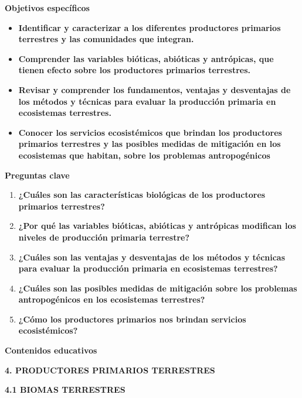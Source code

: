 \documentclass[
]{article}
\providecommand{\tightlist}{%
  \setlength{\itemsep}{0pt}\setlength{\parskip}{0pt}}
\begin{document}
\textbf{Objetivos específicos}

\begin{itemize}
\tightlist
\item
  \textbf{Identificar y caracterizar a los diferentes productores
  primarios terrestres y las comunidades que integran.}
\end{itemize}

\begin{itemize}
\item
  \textbf{Comprender las variables bióticas, abióticas y antrópicas, que
  tienen efecto sobre los productores primarios terrestres.}
\item
  \textbf{Revisar y comprender los fundamentos, ventajas y desventajas
  de los métodos y técnicas para evaluar la producción primaria en
  ecosistemas terrestres.}
\item
  \textbf{Conocer los servicios ecosistémicos que brindan los
  productores primarios terrestres y las posibles medidas de mitigación
  en los ecosistemas que habitan, sobre los problemas antropogénicos}
\end{itemize}

\textbf{\hfill\break
}

\textbf{Preguntas clave}

\begin{enumerate}
\def\labelenumi{\arabic{enumi}.}
\item
  \textbf{¿Cuáles son las características biológicas de los productores
  primarios terrestres?}
\item
  \textbf{¿Por qué las variables bióticas, abióticas y antrópicas
  modifican los niveles de producción primaria terrestre?}
\item
  \textbf{¿Cuáles son las ventajas y desventajas de los métodos y
  técnicas para evaluar la producción primaria en ecosistemas
  terrestres?}
\item
  \textbf{¿Cuáles son las posibles medidas de mitigación sobre los
  problemas antropogénicos en los ecosistemas terrestres?}
\item
  \textbf{¿Cómo los productores primarios nos brindan servicios
  ecosistémicos?}
\end{enumerate}

\textbf{Contenidos educativos}

\textbf{4. PRODUCTORES PRIMARIOS TERRESTRES}

\textbf{4.1 BIOMAS TERRESTRES}
\end{document}
